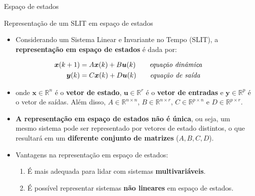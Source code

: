 \begin{frame}{Espaço de estados}
\begin{block}{Representação de um SLIT em espaço de estados}
	\begin{itemize}
		\item Considerando um Sistema Linear e Invariante no Tempo (SLIT), a \textbf{representação em espaço de estados} é dada por:
	\end{itemize}
\begin{align*}
    \bm{x}(k+1) &= A\bm{x}(k) + B\bm{u}(k) \qquad \text{\textit{equação dinâmica}} \\
    \bm{y}(k) &= C\bm{x}(k) + D\bm{u}(k) \qquad \text{\textit{equação de saída}}
\end{align*}
\vspace{-0.3cm}
	\begin{itemize}
		\item[] onde $\bm{x} \in \mathbb{R}^n$ é o \textbf{vetor de estado}, $\bm{u} \in \mathbb{R}^r$ é o \textbf{vetor de entradas} e $\bm{y} \in \mathbb{R}^p$ é o vetor de saídas. Além disso, $A \in \mathbb{R}^{n \times n}$, $B \in \mathbb{R}^{n \times r}$, $C \in \mathbb{R}^{p \times n}$ e $D \in \mathbb{R}^{p \times r}$.
		\item \textbf{A representação em espaço de estados não é única}, ou seja, um mesmo sistema pode ser representado por vetores de estado distintos, o que resultará em um \textbf{diferente conjunto de  matrizes} ($A, B, C, D$).
		\item Vantagens na representação em espaço de estados:
	    \begin{enumerate}
	        \item É mais adequada para lidar com sistemas \textbf{multivariáveis}.		\item É possível representar sistemas \textbf{não lineares} em espaço de estados.
	    \end{enumerate}
	\end{itemize}
\end{block}
\end{frame}

